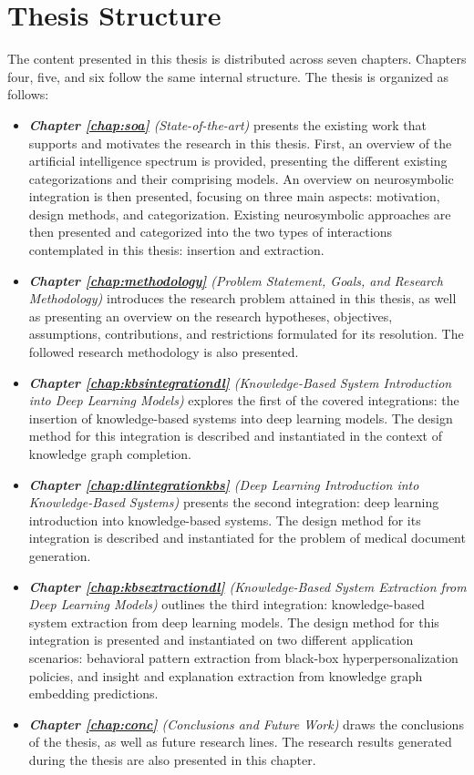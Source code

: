 \section{Thesis Structure}
The content presented in this thesis is distributed across seven chapters. Chapters four, five, and six follow the same internal structure. The thesis is organized as follows:
\begin{itemize}
    \item \textit{\textbf{Chapter \ref{chap:soa}} (State-of-the-art)} presents the existing work that supports and motivates the research in this thesis. First, an overview of the artificial intelligence spectrum is provided, presenting the different existing categorizations and their comprising models. An overview on neurosymbolic integration is then presented, focusing on three main aspects: motivation, design methods, and categorization. Existing neurosymbolic approaches are then presented and categorized into the two types of interactions contemplated in this thesis: insertion and extraction.
    
    \item \textit{\textbf{Chapter \ref{chap:methodology}} (Problem Statement, Goals, and Research Methodology)} introduces the research problem attained in this thesis, as well as presenting an overview on the research hypotheses, objectives, assumptions, contributions, and restrictions formulated for its resolution. The followed research methodology is also presented.
    
    \item \textit{\textbf{Chapter \ref{chap:kbsintegrationdl}} (Knowledge-Based System Introduction into Deep Learning Models)} explores the first of the covered integrations: the insertion of knowledge-based systems into deep learning models. The design method for this integration is described and instantiated in the context of knowledge graph completion.
    
    \item \textit{\textbf{Chapter \ref{chap:dlintegrationkbs}} (Deep Learning Introduction into Knowledge-Based Systems)} presents the second integration: deep learning introduction into knowledge-based systems. The design method for its integration is described and instantiated for the problem of medical document generation.
    
    \item \textit{\textbf{Chapter \ref{chap:kbsextractiondl}} (Knowledge-Based System Extraction from Deep Learning Models)} outlines the third integration: knowledge-based system extraction from deep learning models. The design method for this integration is presented and instantiated on two different application scenarios: behavioral pattern extraction from black-box hyperpersonalization policies, and insight and explanation extraction from knowledge graph embedding predictions.
    
    \item \textit{\textbf{Chapter \ref{chap:conc}} (Conclusions and Future Work)} draws the conclusions of the thesis, as well as future research lines. The research results generated during the thesis are also presented in this chapter.
\end{itemize}
